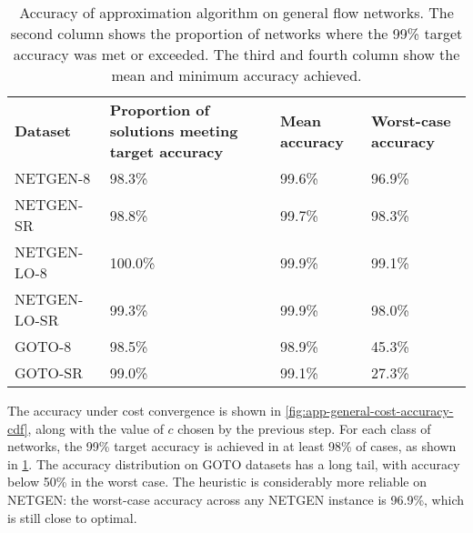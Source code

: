 \begin{table}
    \centering
    \begin{tabular}{lp{}p{}p{}}
        \textbf{Dataset} & \textbf{Proportion of solutions meeting target accuracy} & \textbf{Mean accuracy} & \textbf{Worst-case accuracy} \tabularnewline
        NETGEN-8 & 98.3\% & 99.6\% & 96.9\% \tabularnewline
        NETGEN-SR & 98.8\% & 99.7\% & 98.3\% \tabularnewline
        NETGEN-LO-8 & 100.0\% & 99.9\% & 99.1\% \tabularnewline
        NETGEN-LO-SR & 99.3\% & 99.9\% & 98.0\% \tabularnewline
        GOTO-8 & 98.5\% & 98.9\% & 45.3\% \tabularnewline
        GOTO-SR & 99.0\% & 99.1\% & 27.3\% \tabularnewline
    \end{tabular}
    \caption[Accuracy of approximation algorithm on general flow networks]{Accuracy of approximation algorithm on general flow networks. The second column shows the proportion of networks where the 99\% target accuracy was met or exceeded. The third and fourth column show the mean and minimum accuracy achieved.}
    \label{table:app-general-accuracy}
\end{table}

The accuracy under cost convergence is shown in \cref{fig:app-general-cost-accuracy-cdf}, along with the value of $c$ chosen by the previous step. For each class of networks, the 99\% target accuracy is achieved in at least 98\% of cases, as shown in \cref{table:app-general-accuracy}. The accuracy distribution on GOTO datasets has a long tail, with accuracy below 50\% in the worst case. The heuristic is considerably more reliable on NETGEN: the worst-case accuracy across any NETGEN instance is 96.9\%, which is still close to optimal.

